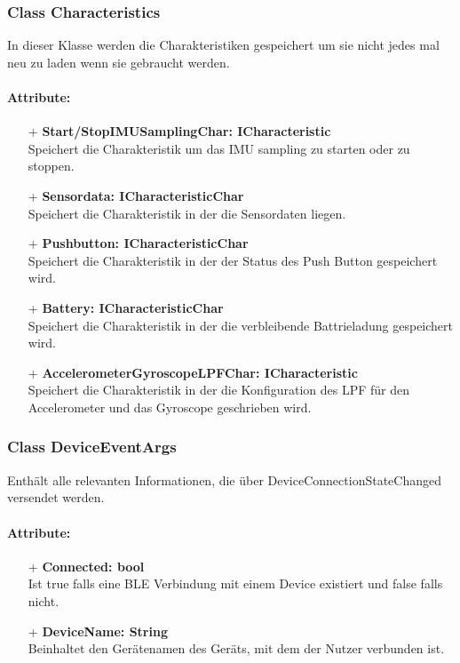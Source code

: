 \documentclass[a4paper,12pt]{article}
\begin{document}
\subsubsection{Class Characteristics}
In dieser Klasse werden die Charakteristiken gespeichert um sie nicht jedes mal neu zu laden wenn sie gebraucht werden.

\paragraph{Attribute:}
\begin{itemize}
	\item[+] \textbf{Start/StopIMUSamplingChar: ICharacteristic}\\Speichert die Charakteristik um das IMU sampling zu starten oder zu stoppen.
	\item[+] \textbf{Sensordata: ICharacteristicChar}\\Speichert die Charakteristik in der die Sensordaten liegen.
	\item[+] \textbf{Pushbutton: ICharacteristicChar}\\Speichert die Charakteristik in der der Status des Push Button gespeichert wird.
	\item[+] \textbf{Battery: ICharacteristicChar}\\Speichert die Charakteristik in der die verbleibende Battrieladung gespeichert wird.
	\item[+] \textbf{AccelerometerGyroscopeLPFChar: ICharacteristic}\\Speichert die Charakteristik in der die Konfiguration des LPF für den Accelerometer und das Gyroscope geschrieben wird.
\end{itemize}


\subsubsection{Class DeviceEventArgs}
Enthält alle relevanten Informationen, die über DeviceConnectionStateChanged versendet werden.

\paragraph{Attribute:}
\begin{itemize}
	\item[+] \textbf{Connected: bool}\\Ist true falls eine BLE Verbindung mit einem Device existiert und false falls nicht.
	\item[+] \textbf{DeviceName: String}\\Beinhaltet den Gerätenamen des Geräts, mit dem der Nutzer verbunden ist. 
\end{itemize}
\end{document}
